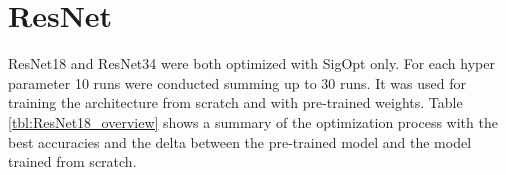\begin{figure}[H]
\label{fig:vgg13_heatmap}
\end{figure}















\section{ResNet}

ResNet18 and ResNet34 were both optimized with SigOpt only. For each hyper parameter 10 runs were conducted summing up to 30 runs. It was used for training the architecture from scratch and with pre-trained weights. Table \ref{tbl:ResNet18_overview} shows a summary of the optimization process with the best accuracies and the delta between the pre-trained model and the model trained from scratch.


